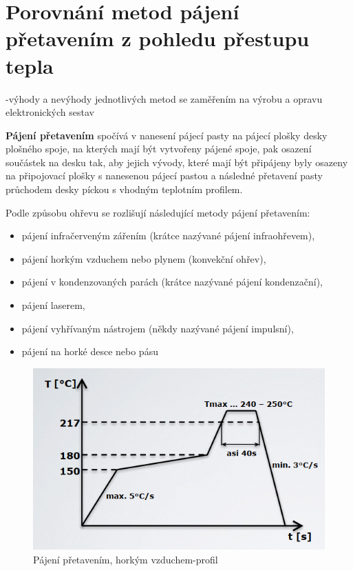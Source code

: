 \section{Porovnání metod pájení přetavením z pohledu přestupu tepla}
-výhody a nevýhody jednotlivých metod se zaměřením na výrobu a opravu elektronických sestav

\textbf{Pájení přetavením} spočívá v nanesení pájecí pasty na pájecí plošky desky plošného
spoje, na kterých mají být vytvořeny pájené spoje, pak osazení součástek na desku tak,
aby jejich vývody, které mají být připájeny byly osazeny na připojovací plošky s
nanesenou pájecí pastou a následné přetavení pasty průchodem desky píckou s
vhodným teplotním profilem.

Podle způsobu ohřevu se rozlišují následující metody pájení přetavením:
\begin{itemize}
\item pájení infračerveným zářením (krátce nazývané pájení infraohřevem),
\item pájení horkým vzduchem nebo plynem (konvekční ohřev),
\item pájení v kondenzovaných parách (krátce nazývané pájení kondenzační),
\item pájení laserem,
\item pájení vyhřívaným nástrojem (někdy nazývané pájení impulsní),
\item pájení na horké desce nebo pásu
\end{itemize}

\begin{figure}[h]
   \begin{center}
     \includegraphics[scale=0.6]{images/Profil.png}
   \end{center}
   \caption{Pájení přetavením, horkým vzduchem-profil}
\end{figure}
